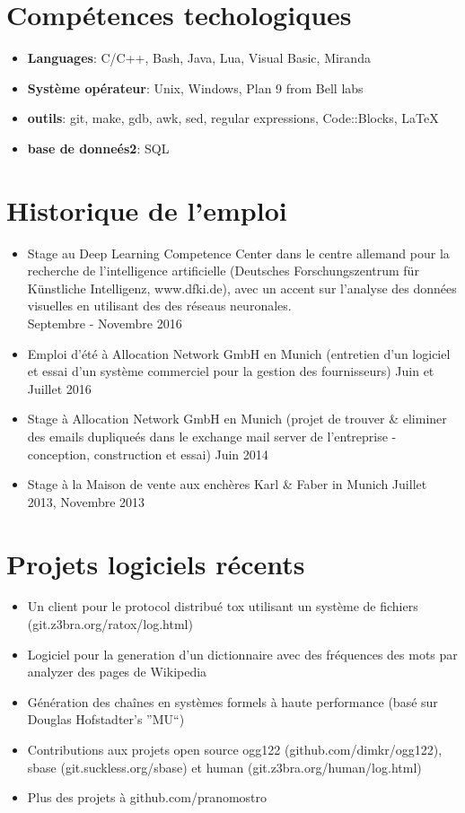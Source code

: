\documentclass[11pt,a4paper]{article}
\begin{document}
\section*{Compétences techologiques}
\begin{itemize}
	\setlength{\itemsep}{1pt}
	\item[]{\bf Languages}: C/C++, Bash, Java, Lua, Visual Basic, Miranda
	\item[]{\bf Système opérateur}: Unix, Windows, Plan 9 from Bell labs
	\item[]{\bf outils}: git, make, gdb, awk, sed, regular expressions, Code::Blocks, LaTeX
	\item[]{\bf base de donneés2}: SQL
\end{itemize}

\section*{Historique de l'emploi}
\begin{itemize}
	\setlength{\itemsep}{1pt}
	\item Stage au Deep Learning Competence Center dans le centre allemand pour la recherche de l'intelligence artificielle
	(Deutsches Forschungszentrum für Künstliche Intelligenz, www.dfki.de), avec un accent sur l'analyse des données visuelles en utilisant des des réseaus neuronales.\\
	\hfill Septembre - Novembre 2016
	\item Emploi d'été à Allocation Network GmbH en Munich (entretien d'un logiciel et essai d'un système commerciel pour la gestion des fournisseurs)
	\hfill Juin et Juillet 2016
	\item Stage à Allocation Network GmbH en Munich (projet de trouver
	\& eliminer des emails dupliqueés dans le exchange mail server de l'entreprise - conception, construction et essai)
	\hfill Juin 2014
	\item Stage à la Maison de vente aux enchères Karl \& Faber in Munich \hfill Juillet 2013, Novembre 2013
\end{itemize}

\section*{Projets logiciels récents}
\begin{itemize}
	\setlength{\itemsep}{1pt}
	\item Un client pour le protocol distribué tox utilisant un système de fichiers\\
	(git.z3bra.org/ratox/log.html)
	\item Logiciel pour la generation d'un dictionnaire avec des fréquences des mots
	par analyzer des pages de Wikipedia
	\item Génération des chaînes en systèmes formels à haute performance
	(basé sur Douglas Hofstadter's ''MU``)
	\item Contributions aux projets open source ogg122 (github.com/dimkr/ogg122),\\
	sbase (git.suckless.org/sbase) et human (git.z3bra.org/human/log.html)
	\item Plus des projets à github.com/pranomostro
\end{itemize}
\end{document}
